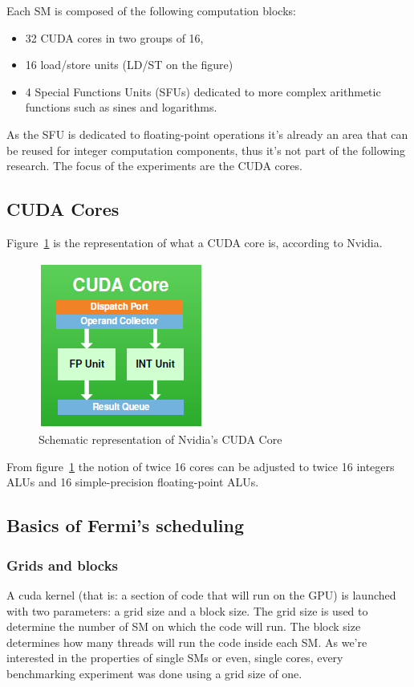 \documentclass{article}
\begin{document}
    Each SM is composed of the following computation blocks:
    \begin{itemize}
        \item 32 CUDA cores in two groups of 16,
        \item 16 load/store units (LD/ST on the figure)
        \item 4 Special Functions Units (SFUs) dedicated to more complex
              arithmetic functions such as sines and logarithms.
    \end{itemize}
    
    As the SFU is dedicated to floating-point operations it's already an area
    that can be reused for integer computation components, thus it's not part
    of the following research. The focus of the experiments are the CUDA cores.

    \subsection{CUDA Cores}
    Figure~\ref{fig:CUDACore} is the representation of what a CUDA core is,
    according to Nvidia.
    
    \begin{figure}[H]
    \centering
        \includegraphics{pictures/CUDACore}
        \caption{Schematic representation of Nvidia's CUDA Core}
        \label{fig:CUDACore}
    \end{figure}
    
    From figure~\ref{fig:CUDACore} the notion of twice 16 cores can be
    adjusted to twice 16 integers ALUs and 16 simple-precision floating-point
    ALUs.

    \subsection{Basics of Fermi's scheduling}
        \subsubsection{Grids and blocks} 
        A cuda kernel (that is: a section of code that will run on the GPU) is
        launched with two parameters: a grid size and a block size. The grid 
        size is used to determine the number of SM on which the code will run.
        The block size determines how many threads will run the code inside each
        SM. As we're interested in the properties of single SMs or even, single
        cores, every benchmarking experiment was done using a grid size of one.
\end{document}
